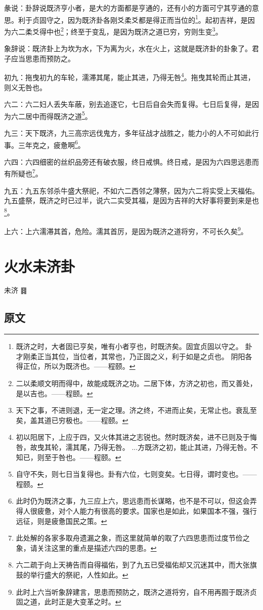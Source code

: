 \documentclass[12pt,oneside]{book}
\begin{document}
彖说：卦辞说既济亨小者，是大的方面都是亨通的，还有小的方面可宁其亨通的意思。利于贞固守之，因为既济卦各刚爻柔爻都是得正而当位的\footnote{既济之时，大者固已亨矣，唯有小者亨也，时既济矣。固宜贞固以守之。 卦才刚柔正当其位，当位者，其常也，乃正固之义，利于如是之贞也。 阴阳各得正位，所以为既济也。——程颐。}。起初吉祥，是因为六二柔爻得中也\footnote{二以柔顺文明而得中，故能成既济之功。二居下体，方济之初也，而又善处，是以吉也。——程颐。}；终至于变乱，是因为既济之道已穷，穷则生变\footnote{天下之事，不进则退，无一定之理。济之终，不进而止矣，无常止也。衰乱至矣，盖其道已穷极也。——程颐。}。

象辞说：既济卦上为坎为水，下为离为火，水在火上，这就是既济卦的卦象了。君子应当思患而预防之。

初九：拖曳初九的车轮，濡滞其尾，能止其进，乃得无咎\footnote{初以阳居下，上应于四，又火体其进之志锐也。然时既济矣，进不已则及于悔咎，故曳其轮，濡其尾，乃得无咎。 ...方既济之初，能止其进，乃得无咎。不知已，则至于咎也。——程颐。}。拖曳其轮而止其进，则义无咎也。

六二：六二妇人丢失车蔽，别去追逐它，七日后自会失而复得。七日后复得，是因为六二居中而得既济之道\footnote{自守不失，则七日当复得也。卦有六位，七则变矣。七日得，谓时变也。——程颐。}。

九三：天下既济，九三高宗远伐鬼方，多年征战才战胜之，能力小的人不可如此行事。三年克之，疲惫啊\footnote{此时仍为既济之事，九三应上六，思远患而长谋略，也不是不可以，但这会弄得人很疲惫，对个人能力有很高的要求。国家也是如此，如果国本不强，强行远征，则是疲惫国民之策。}。

六四：六四细密的丝织品旁还有破衣服，终日戒惧。终日戒，是因为六四思远患而有所疑也\footnote{此处解的各家多取舟遗漏之象，而这里就简单的取了六四思患而过度节俭之象，请关注这里的重点是描述六四的思患。}。

九五：九五东邻杀牛盛大祭祀，不如六二西邻之薄祭，因为六二将实受上天福佑。九五盛祭，既济之时已过半，说六二实受其福，是因为吉祥的大好事将要到来是也\footnote{六二疏于向上天祷告而自得福佑，到了九五已受福佑却又沉迷其中，而大张旗鼓的举行盛大的祭祀，人性如此。}。

上六：上六濡滞其首，危险。濡其首厉，是因为既济之道将穷，不可长久矣\footnote{此时上六当听象辞建言，思患而预防之，既济之道将穷，自不用再囿于既济贞固之道，此时正是大变革之时。}。



\chapter{火水未济卦}
未济 {\Large ䷿}
\section{原文}
\end{document}
